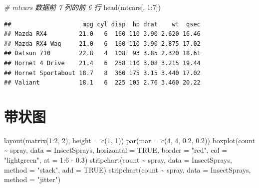 \documentclass[
  b5paper,
  UTF8,twoside]{book}
\newenvironment{Shaded}{\begin{snugshade}}{\end{snugshade}}
\newcommand{\AttributeTok}[1]{\textcolor[rgb]{0.77,0.63,0.00}{#1}}
\newcommand{\CommentTok}[1]{\textcolor[rgb]{0.56,0.35,0.01}{\textit{#1}}}
\newcommand{\ConstantTok}[1]{\textcolor[rgb]{0.00,0.00,0.00}{#1}}
\newcommand{\DecValTok}[1]{\textcolor[rgb]{0.00,0.00,0.81}{#1}}
\newcommand{\FloatTok}[1]{\textcolor[rgb]{0.00,0.00,0.81}{#1}}
\newcommand{\FunctionTok}[1]{\textcolor[rgb]{0.00,0.00,0.00}{#1}}
\newcommand{\NormalTok}[1]{#1}
\newcommand{\SpecialCharTok}[1]{\textcolor[rgb]{0.00,0.00,0.00}{#1}}
\newcommand{\StringTok}[1]{\textcolor[rgb]{0.31,0.60,0.02}{#1}}
\begin{document}
\begin{Shaded}
\begin{Highlighting}[]
\CommentTok{\# mtcars 数据前 7 列的前 6 行}
\FunctionTok{head}\NormalTok{(mtcars[, }\DecValTok{1}\SpecialCharTok{:}\DecValTok{7}\NormalTok{])}
\end{Highlighting}
\end{Shaded}

\begin{verbatim}
##                    mpg cyl disp  hp drat    wt  qsec
## Mazda RX4         21.0   6  160 110 3.90 2.620 16.46
## Mazda RX4 Wag     21.0   6  160 110 3.90 2.875 17.02
## Datsun 710        22.8   4  108  93 3.85 2.320 18.61
## Hornet 4 Drive    21.4   6  258 110 3.08 3.215 19.44
## Hornet Sportabout 18.7   8  360 175 3.15 3.440 17.02
## Valiant           18.1   6  225 105 2.76 3.460 20.22
\end{verbatim}

\hypertarget{sec:stripchart}{%
\section{带状图}\label{sec:stripchart}}





\begin{Shaded}
\begin{Highlighting}[]
\FunctionTok{layout}\NormalTok{(}\FunctionTok{matrix}\NormalTok{(}\DecValTok{1}\SpecialCharTok{:}\DecValTok{2}\NormalTok{, }\DecValTok{2}\NormalTok{), }\AttributeTok{height =} \FunctionTok{c}\NormalTok{(}\DecValTok{1}\NormalTok{, }\DecValTok{1}\NormalTok{))}
\FunctionTok{par}\NormalTok{(}\AttributeTok{mar =} \FunctionTok{c}\NormalTok{(}\DecValTok{4}\NormalTok{, }\DecValTok{4}\NormalTok{, }\FloatTok{0.2}\NormalTok{, }\FloatTok{0.2}\NormalTok{))}
\FunctionTok{boxplot}\NormalTok{(count }\SpecialCharTok{\textasciitilde{}}\NormalTok{ spray, }\AttributeTok{data =}\NormalTok{ InsectSprays, }\AttributeTok{horizontal =} \ConstantTok{TRUE}\NormalTok{, }
        \AttributeTok{border =} \StringTok{"red"}\NormalTok{, }\AttributeTok{col =} \StringTok{"lightgreen"}\NormalTok{, }\AttributeTok{at =} \DecValTok{1}\SpecialCharTok{:}\DecValTok{6} \SpecialCharTok{{-}} \FloatTok{0.3}\NormalTok{)}
\FunctionTok{stripchart}\NormalTok{(count }\SpecialCharTok{\textasciitilde{}}\NormalTok{ spray, }\AttributeTok{data =}\NormalTok{ InsectSprays, }\AttributeTok{method =} \StringTok{"stack"}\NormalTok{, }\AttributeTok{add =} \ConstantTok{TRUE}\NormalTok{)}
\FunctionTok{stripchart}\NormalTok{(count }\SpecialCharTok{\textasciitilde{}}\NormalTok{ spray, }\AttributeTok{data =}\NormalTok{ InsectSprays, }\AttributeTok{method =} \StringTok{"jitter"}\NormalTok{)}
\end{Highlighting}
\end{Shaded}
\end{document}
